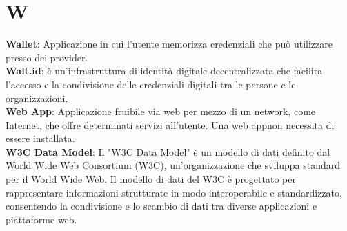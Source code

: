 \section{W}
\textbf{Wallet}: Applicazione in cui l'utente memorizza credenziali che può utilizzare presso dei provider.\\ %
\textbf{Walt.id}: è un'infrastruttura di identità digitale decentralizzata che facilita l'accesso e la condivisione delle credenziali digitali tra le persone e le organizzazioni.\\
\textbf{Web App}: Applicazione fruibile via web per mezzo di un network, come Internet, che offre determinati servizi all'utente. Una web app\glo non necessita di essere installata.\\
\textbf{W3C Data Model}: Il "W3C Data Model" è un modello di dati definito dal World Wide Web Consortium (W3C), un'organizzazione che sviluppa standard per il World Wide Web. Il modello di dati del W3C è progettato per rappresentare informazioni strutturate in modo interoperabile e standardizzato, consentendo la condivisione e lo scambio di dati tra diverse applicazioni e piattaforme web.\\
